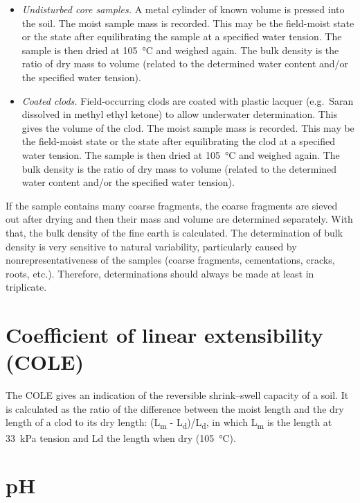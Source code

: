 \documentclass[
  letterpaper,
  DIV=11,
  numbers=noendperiod]{scrreprt}
\begin{document}
\begin{itemize}
\item
  \emph{Undisturbed core samples.} A metal cylinder of known volume is
  pressed into the soil. The moist sample mass is recorded. This may be
  the field-moist state or the state after equilibrating the sample at a
  specified water tension. The sample is then dried at 105~°C and
  weighed again. The bulk density is the ratio of dry mass to volume
  (related to the determined water content and/or the specified water
  tension).
\item
  \emph{Coated clods.} Field-occurring clods are coated with plastic
  lacquer (e.g.~Saran dissolved in methyl ethyl ketone) to allow
  underwater determination. This gives the volume of the clod. The moist
  sample mass is recorded. This may be the field-moist state or the
  state after equilibrating the clod at a specified water tension. The
  sample is then dried at 105~°C and weighed again. The bulk density is
  the ratio of dry mass to volume (related to the determined water
  content and/or the specified water tension).
\end{itemize}

If the sample contains many coarse fragments, the coarse fragments are
sieved out after drying and then their mass and volume are determined
separately. With that, the bulk density of the fine earth is calculated.
The determination of bulk density is very sensitive to natural
variability, particularly caused by nonrepresentativeness of the samples
(coarse fragments, cementations, cracks, roots, etc.). Therefore,
determinations should always be made at least in triplicate.

\hypertarget{coefficient-of-linear-extensibility-cole}{%
\section{Coefficient of linear extensibility
(COLE)}\label{coefficient-of-linear-extensibility-cole}}

The COLE gives an indication of the reversible shrink--swell capacity of
a soil. It is calculated as the ratio of the difference between the
moist length and the dry length of a clod to its dry length:
(L\textsubscript{m} - L\textsubscript{d})/L\textsubscript{d}, in which
L\textsubscript{m} is the length at 33~kPa tension and Ld the length
when dry (105~°C).

\hypertarget{ph}{%
\section{pH}\label{ph}}
\end{document}
